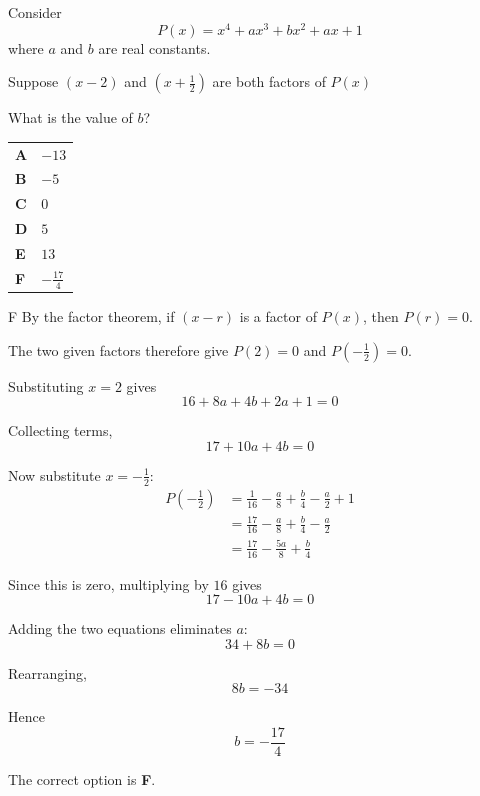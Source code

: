 \documentclass[11pt,a4paper]{article}
\begin{document}
\clearpage
\thispagestyle{djssolutions}
\vspace*{8pt}
\begin{enumerate}[label=\textbf{\arabic*.},leftmargin=*,itemsep=0pt,start=16]
\questionitem[Polynomials]
Consider
\[P(x)=x^4+ax^3+bx^2+ax+1\]
where $a$ and $b$ are real constants.

Suppose $(x-2)$ and $\left(x+\frac{1}{2}\right)$ are both factors of $P(x)$

What is the value of $b$?

\par\vspace*{12pt}
\begin{tabularx}{\linewidth}{@{}>{\bfseries}l Y@{}}
A &
$-13$
\\[0.8em]
B &
$-5$
\\[0.8em]
C &
$0$
\\[0.8em]
D &
$5$
\\[0.8em]
E &
$13$
\\[0.8em]
F &
$-\frac{17}{4}$
\\
\end{tabularx}

\begin{djsSolution}{F}
By the factor theorem, if $(x-r)$ is a factor of $P(x)$, then $P(r)=0$.

The two given factors therefore give $P(2)=0$ and $P\left(-\frac12\right)=0$.

Substituting $x=2$ gives
\[
16+8a+4b+2a+1=0
\]

Collecting terms,
\[
17+10a+4b=0
\]

Now substitute $x=-\frac12$:
\[
\begin{aligned}
P\left(-\frac12\right)
&=\frac1{16}-\frac a8+\frac b4-\frac a2+1\\[8pt]
&=\frac{17}{16}-\frac a8+\frac b4-\frac a2\\[8pt]
&=\frac{17}{16}-\frac{5a}{8}+\frac b4
\end{aligned}
\]

Since this is zero, multiplying by $16$ gives
\[
17-10a+4b=0
\]

Adding the two equations eliminates $a$:
\[
34+8b=0
\]

Rearranging,
\[
8b=-34
\]

Hence
\[
b=-\frac{17}{4}
\]

The correct option is \textbf{F}.
\end{djsSolution}
\end{enumerate}
\end{document}
